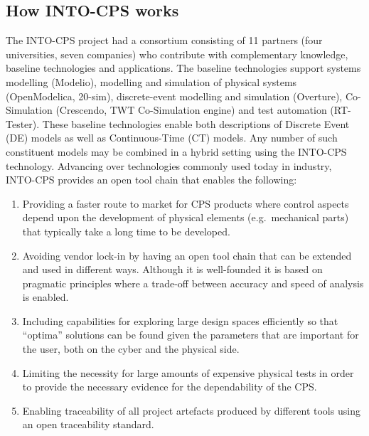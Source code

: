 \subsection{How INTO-CPS works}

The INTO-CPS project had a consortium consisting of 11 partners (four universities, seven companies) who contribute with complementary knowledge, baseline technologies and applications. The baseline technologies support systems modelling (Modelio), modelling and simulation of physical systems (OpenModelica, 20-sim), discrete-event modelling and simulation (Overture), Co-Simulation (Crescendo, TWT Co-Simulation engine) and test automation (RT-Tester). These baseline technologies enable both descriptions of Discrete Event (DE) models as well as Continuous-Time (CT) models. Any number of such constituent models may be combined in a hybrid setting using the INTO-CPS technology. Advancing over technologies commonly used today in industry, INTO-CPS provides an open tool chain that enables the following:

\begin{enumerate}
\item Providing a faster route to market for CPS products where control aspects depend upon the development of physical elements (e.g.\ mechanical parts) that typically take a long time to be developed.
\item Avoiding vendor lock-in by having an open tool chain that can be extended and used in different ways. Although it is well-founded it is based on pragmatic principles where a trade-off between accuracy and speed of analysis is enabled.
\item Including capabilities for exploring large design spaces efficiently so that ``optima'' solutions can be found given the parameters that are important for the user, both on the cyber and the physical side.
\item Limiting the necessity for large amounts of expensive physical tests in order to provide the necessary evidence for the dependability of the CPS.
\item Enabling traceability of all project artefacts produced by different tools using an open traceability standard.
\end{enumerate}

